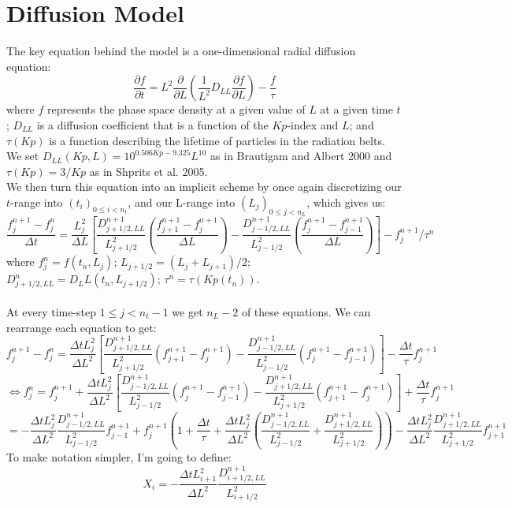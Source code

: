 \documentclass[a4paper, fleqn]{article}
\begin{document}
\section{Diffusion Model}
The key equation behind the model is a one-dimensional radial diffusion equation:
\[\frac{\partial f}{\partial t}=L^2\frac{\partial}{\partial L}\left(\frac{1}{L^2}D_{LL}\frac{\partial f}{\partial L}\right)-\frac{f}{\tau}\]
where $f$ represents the phase space density at a given value of $L$ at a given time $t$; $D_{LL}$ is a diffusion coefficient that is a function of the $Kp$-index and $L$; and $\tau(Kp)$ is a function describing the lifetime of particles in the radiation belts. We set $D_{LL}(Kp, L)=10^{0.506Kp-9.325}L^{10}$ as in Brautigam and Albert 2000 and $\tau(Kp) = 3/Kp$ as in Shprits et al. 2005.\\
We then turn this equation into an implicit scheme by once again discretizing our $t$-range into $(t_i)_{0 \leq i < n_t}$, and our L-range into $(L_j)_{0 \leq j < n_L}$, which gives us:
\[\frac{f_j^{n+1}-f_j^n}{\Delta t}=\frac{L_j^2}{\Delta L}\left[
\frac{D_{j+1/2, LL}^{n+1}}{L_{j+1/2}^2}\left(\frac{f_{j+1}^{n+1}-f_j^{n+1}}{\Delta L}\right)
-\frac{D_{j-1/2, LL}^{n+1}}{L_{j-1/2}^2}\left(\frac{f_{j}^{n+1}-f_{j-1}^{n+1}}{\Delta L}\right)
\right]-f_j^{n+1}/{\tau^n}\]
where $f_j^n = f(t_n, L_j)$;  $L_{j+1/2} = (L_j+L_{j+1})/2$; $D_{j+1/2, LL}^{n}=D_LL(t_{n}, L_{j+1/2})$; $\tau^n=\tau(Kp(t_n))$.\\
\\
At every time-step $1\leq j < n_t - 1$ we get $n_L-2$ of these equations. We can rearrange each equation to get:
\[f_j^{n+1}-f_j^n=\frac{\Delta t L_j^2}{\Delta L^2}\left[\frac{D_{j+1/2, LL}^{n+1}}{L_{j+1/2}^2}\left(f_{j+1}^{n+1}-f_j^{n+1}\right)-\frac{D_{j-1/2, LL}^{n+1}}{L_{j-1/2}^2}\left(f_{j}^{n+1}-f_{j-1}^{n+1}\right)\right]-\frac{\Delta t}{\tau} f_j^{n+1}\]
\[\iff f_j^n=f_j^{n+1}+\frac{\Delta t L_j^2}{\Delta L^2}\left[\frac{D_{j-1/2, LL}^{n+1}}{L_{j-1/2}^2}\left(f_{j}^{n+1}-f_{j-1}^{n+1}\right)-\frac{D_{j+1/2, LL}^{n+1}}{L_{j+1/2}^2}\left(f_{j+1}^{n+1}-f_j^{n+1}\right)\right]+\frac{\Delta t}{\tau} f_j^{n+1}\]
\[=-\frac{\Delta t L_j^2}{\Delta L^2}\frac{D_{j-1/2, LL}^{n+1}}{L_{j-1/2}^2}f_{j-1}^{n+1}
+f_j^{n+1}\left(1+\frac{\Delta t}{\tau}+\frac{\Delta t L_j^2}{\Delta L^2}\left(\frac{D_{j-1/2, LL}^{n+1}}{L_{j-1/2}^2}+\frac{D_{j+1/2, LL}^{n+1}}{L_{j+1/2}^2}\right)\right)
-\frac{\Delta t L_j^2}{\Delta L^2}\frac{D_{j+1/2, LL}^{n+1}}{L_{j+1/2}^2}f_{j+1}^{n+1}
\]
To make notation simpler, I'm going to define:
\[X_i=-\frac{\Delta t L_{i+1}^2}{\Delta L^2}\frac{D_{i+1/2, LL}^{n+1}}{L_{i+1/2}^2}\]
\end{document}
